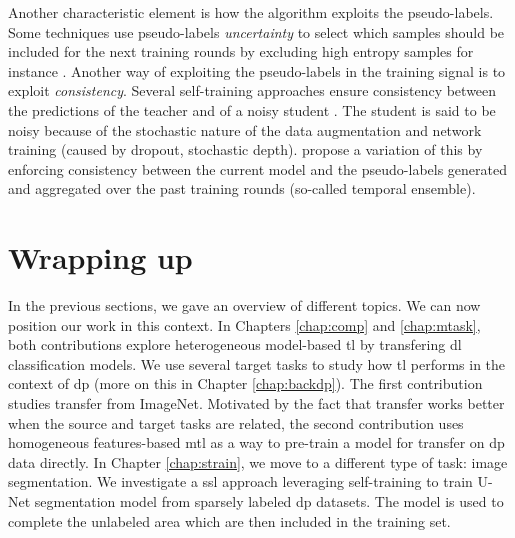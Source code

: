 Another characteristic element is how the algorithm exploits the pseudo-labels. Some techniques use pseudo-labels \textit{uncertainty} to select which samples should be included for the next training rounds by excluding high entropy samples for instance \cite{grandvalet2004semi, lee2013pseudo}. Another way of exploiting the pseudo-labels in the training signal is to exploit \textit{consistency}. Several self-training approaches ensure consistency between the predictions of the teacher and of a noisy student \cite{xie2020self, zhu2020improving, sohn2020fixmatch, tarvainen2017mean}. The student is said to be noisy because of the stochastic nature of the data augmentation and network training (\eg caused by dropout, stochastic depth). \cite{laine2016temporal} propose a variation of this by enforcing consistency between the current model and the pseudo-labels generated and aggregated over the past training rounds (so-called temporal ensemble).

\section{Wrapping up}
\label{sec:backml:wrapup}

In the previous sections, we gave an overview of different topics. We can now position our work in this context. In Chapters \ref{chap:comp}
and \ref{chap:mtask}, both contributions explore heterogeneous model-based
\acrlong{tl} by transfering \acrlong{dl} classification models. We use several
target tasks to study how \acrlong{tl} performs in the context of \acrlong{dp}
(more on this in Chapter \ref{chap:backdp}). The first contribution studies transfer
from ImageNet. Motivated by the fact that transfer works better when the source
and target tasks are related, the second contribution uses homogeneous features-based
\acrlong{mtl} as a way to pre-train a model for transfer on \acrlong{dp} data
directly. In Chapter \ref{chap:strain}, we move to a different type of task: image segmentation.
We investigate a \acrlong{ssl} approach leveraging self-training to train U-Net segmentation
model from sparsely labeled \acrlong{dp} datasets. The model is used to complete the unlabeled area which are 
then included in the training set. 

